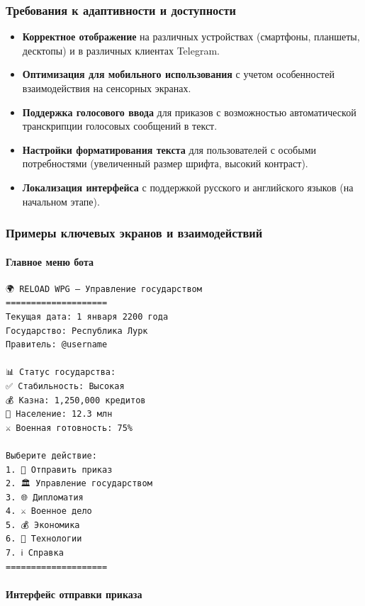 \subsubsection{Требования к адаптивности и доступности}

\begin{itemize}
    \item \textbf{Корректное отображение} на различных устройствах (смартфоны, планшеты, десктопы) и в различных клиентах Telegram.

    \item \textbf{Оптимизация для мобильного использования} с учетом особенностей взаимодействия на сенсорных экранах.

    \item \textbf{Поддержка голосового ввода} для приказов с возможностью автоматической транскрипции голосовых сообщений в текст.

    \item \textbf{Настройки форматирования текста} для пользователей с особыми потребностями (увеличенный размер шрифта, высокий контраст).

    \item \textbf{Локализация интерфейса} с поддержкой русского и английского языков (на начальном этапе).
\end{itemize}

\subsubsection{Примеры ключевых экранов и взаимодействий}

\paragraph{Главное меню бота}

\begin{verbatim}
🌍 RELOAD WPG — Управление государством
====================
Текущая дата: 1 января 2200 года
Государство: Республика Лурк
Правитель: @username

📊 Статус государства:
✅ Стабильность: Высокая
💰 Казна: 1,250,000 кредитов
👥 Население: 12.3 млн
⚔️ Военная готовность: 75%

Выберите действие:
1. 📝 Отправить приказ
2. 🏛 Управление государством
3. 🌐 Дипломатия
4. ⚔️ Военное дело
5. 💰 Экономика
6. 🔬 Технологии
7. ℹ️ Справка
====================
\end{verbatim}

\paragraph{Интерфейс отправки приказа}

